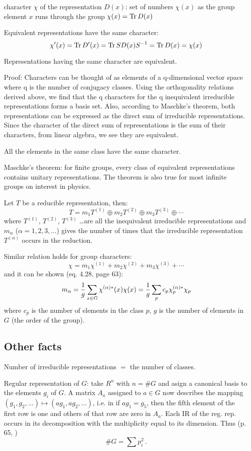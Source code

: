 character $\chi$ of the representation $D(x)$: set of numbers $\chi(x)$ as the
group element $x$ runs through the group $\chi(x)=\hbox{Tr}\, D(x)$

Equivalent representations have the same character:
$$\chi'(x)=\hbox{Tr}\, D'(x)=\hbox{Tr}\, SD(x)S^{-1}=\hbox{Tr}\, D(x)=\chi(x)$$

Representations having the same character are equivalent.

Proof: Characters can be thought of as elements of a q-dimensional vector space
where q is the number of conjugacy classes. Using the orthogonality relations
derived above, we find that the q characters for the q inequivalent irreducible
representations forms a basis set. Also, according to Maschke's theorem, both
representations can be expressed as the direct sum of irreducible
representations. Since the character of the direct sum of representations is
the sum of their characters, from linear algebra, we see they are equivalent.

All the elements in the same class have the same character.

Maschke's theorem: for finite groups, every class of equivalent representations
contains unitary representations. The theorem is also true for most infinite
groups on interest in physics.

Let $T$ be a reducible representation, then:
$$T=m_1T^{(1)} \oplus m_2T^{(2)} \oplus m_3T^{(3)}\oplus \cdots$$
where $T^{(1)}$, $T^{(2)}$, $T^{(3)}$ \dots are 
all the inequivalent irreducible
representations and $m_\alpha$ ($\alpha=1,2,3,\dots$) gives the number of
times that the irreducible representation $T^{(\alpha)}$ occurs in the
reduction.

Similar relation holds for group characters:
$$\chi=m_1\chi^{(1)} + m_2\chi^{(2)} + m_3\chi^{(3)} + \cdots$$
and it can be shown \cite{elliott} (eq. 4.28, page 63):
$$m_\alpha={1\over g}\sum_{x\in G} \chi^{(\alpha)*}(x)\chi(x)=
{1\over g}\sum_{p} c_p\chi^{(\alpha)*}_p\chi_p$$
where $c_p$ is the number of elements in the class $p$, $g$ is the number of
elements in $G$ (the order of the group).


\subsection{Other facts}

Number of irreducible representations $=$ the number of classes.

{\tenit Regular representation} of $G$: 
take $R^n$ with $n=\# G$ and asign a canonical
basis to the elements $g_i$ of $G$. A matrix $A_a$ assigned to $a\in G$ now
describes the mapping $(g_1,g_2,\ldots)\mapsto (ag_1,ag_2,\ldots)$, i.e. in if
$ag_1=g_5$, then the fifth element of the first row is one and others of that
row are zero in $A_a$. Each IR of the reg. rep. occurs in its decomposition
with the multiplicity equal to its dimension. Thus (p. 65, \cite{sternberg})
%
$$
  \# G = \sum p_i^2\,.
$$
%

